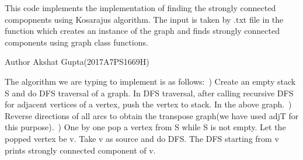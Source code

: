 This code implements the implementation of finding the strongly connected compopnents using Kosarajus algorithm. The input is taken by .txt file in the function which creates an instance of the graph and finds strongly connected components using graph class functions. \begin{DoxyAuthor}{Author}
Akshat Gupta(2017\+A7\+PS1669\+H)
\end{DoxyAuthor}
The algorithm we are typing to implement is as follows\+:~) Create an empty stack S and do DFS traversal of a graph. In DFS traversal, after calling recursive DFS for adjacent vertices of a vertex, push the vertex to stack. In the above graph.~) Reverse directions of all arcs to obtain the transpose graph(we have used adj\+T for this purpose).~) One by one pop a vertex from S while S is not empty. Let the popped vertex be v. Take v as source and do DFS. The DFS starting from v prints strongly connected component of v.~\newline
